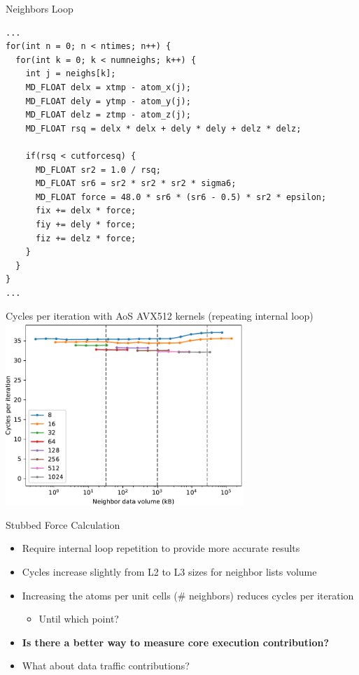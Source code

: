 \documentclass[aspectratio=169,t]{beamer}
\begin{document}
  \begin{frame}[fragile]{Neighbors Loop}
    \begin{lstlisting}
...
for(int n = 0; n < ntimes; n++) {
  for(int k = 0; k < numneighs; k++) {
    int j = neighs[k];
    MD_FLOAT delx = xtmp - atom_x(j);
    MD_FLOAT dely = ytmp - atom_y(j);
    MD_FLOAT delz = ztmp - atom_z(j);
    MD_FLOAT rsq = delx * delx + dely * dely + delz * delz;

    if(rsq < cutforcesq) {
      MD_FLOAT sr2 = 1.0 / rsq;
      MD_FLOAT sr6 = sr2 * sr2 * sr2 * sigma6;
      MD_FLOAT force = 48.0 * sr6 * (sr6 - 0.5) * sr2 * epsilon;
      fix += delx * force;
      fiy += dely * force;
      fiz += delz * force;
    }
  }
}
...
    \end{lstlisting}
  \end{frame}

  \begin{frame}[fragile]{Cycles per iteration with AoS AVX512 kernels (repeating internal loop)}
    \includegraphics[width=9cm]{results_aos_casclakesp2_rep_neighbor_vol.pdf}
  \end{frame}

  \begin{frame}[fragile]{Stubbed Force Calculation}
    \begin{itemize}
      \item Require internal loop repetition to provide more accurate results
      \item Cycles increase slightly from L2 to L3 sizes for neighbor lists volume
      \item Increasing the atoms per unit cells (\# neighbors) reduces cycles per iteration
      \begin{itemize}
        \item Until which point?
      \end{itemize}
      \item \textbf{Is there a better way to measure core execution contribution?}
      \item What about data traffic contributions?
    \end{itemize}
  \end{frame}
\end{document}
